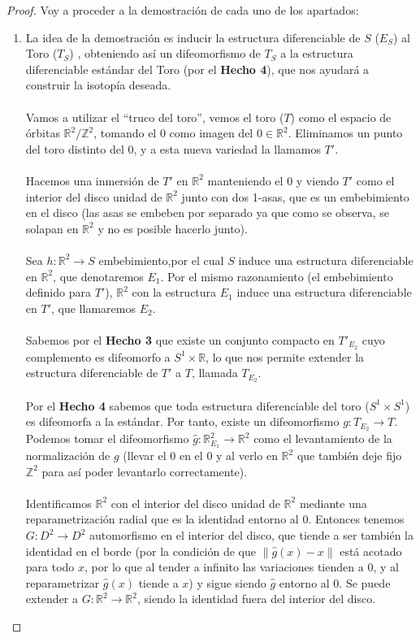 	\begin{proof}
		Voy a proceder a la demostración de cada uno de los apartados: \\
		\begin{enumerate}
			\item La idea de la demostración es inducir la estructura diferenciable de $S$ ($E_S$) al Toro ($T_S$) , obteniendo así un difeomorfismo de $T_S$ a la estructura diferenciable estándar del Toro (por el \textbf{Hecho 4}), que nos ayudará a construir la isotopía deseada.\\
				\\ Vamos a utilizar el ``truco del toro'', vemos el toro ($T$) como el espacio de órbitas $\mathbb{R}^2/\mathbb{Z}^2$, tomando el $0$ como imagen del $0\in \mathbb{R}^2$. Eliminamos un punto del toro distinto del $0$, y a esta nueva variedad la llamamos $T'$. \\
				\\ Hacemos una inmersión de $T'$ en $\mathbb{R}^2$ manteniendo el $0$ y viendo $T'$ como el interior del disco unidad de $\mathbb{R}^2$ junto con dos 1-asas, que es un embebimiento en el disco (las asas se embeben por separado ya que como se observa, se solapan en $\mathbb{R}^2$ y no es posible hacerlo junto).\\
				\\ Sea $h:\mathbb{R}^2 \rightarrow S$ embebimiento,por el cual $S$ induce una estructura diferenciable en $\mathbb{R}^2$, que denotaremos $E_1$. Por el mismo razonamiento (el embebimiento definido para $T'$), $\mathbb{R}^2$ con la estructura $E_1$ induce una estructura diferenciable en $T'$, que llamaremos $E_2$.\\
				\\ Sabemos por el \textbf{Hecho 3} que existe un conjunto compacto en $T'_{E_2}$ cuyo complemento es difeomorfo a $S^1\times \mathbb{R}$, lo que nos permite extender la estructura diferenciable de $T'$ a $T$, llamada $T_{E_2}$.\\
				\\ Por el \textbf{Hecho 4} sabemos que toda estructura diferenciable del toro ($S^1\times S^1$) es difeomorfa a la estándar. Por tanto, existe un difeomorfismo $g: T_{E_2} \rightarrow T$. Podemos tomar el difeomorfismo $\widehat{g}:\mathbb{R}^2_{E_1} \rightarrow \mathbb{R}^2$ como el levantamiento de la normalización de $g$ (llevar el $0$ en el $0$ y al verlo en $\mathbb{R}^2$ que también deje fijo $\mathbb{Z}^2$ para así poder levantarlo correctamente).\\
				\\ Identificamos $\mathbb{R}^2$ con el interior del disco unidad de $\mathbb{R}^2$ mediante una reparametrización radial que es la identidad entorno al $0$. Entonces tenemos $G:D^2 \rightarrow D^2$ automorfismo en el interior del disco, que tiende a ser también la identidad en el borde (por la condición de que $\|\widehat{g}(x) - x\|$ está acotado para todo $x$, por lo que al tender a infinito las variaciones tienden a $0$, y al reparametrizar $\widehat{g}(x)$ tiende a $x$) y sigue siendo $\widehat{g}$ entorno al $0$. Se puede extender a $G:\mathbb{R}^2 \rightarrow \mathbb{R}^2$, siendo la identidad fuera del interior del disco.\\

\end{enumerate}
\end{proof}
